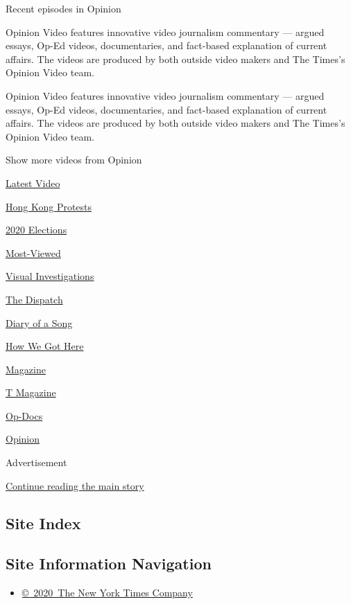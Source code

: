 Recent episodes in Opinion

Opinion Video features innovative video journalism commentary --- argued
essays, Op-Ed videos, documentaries, and fact-based explanation of
current affairs. The videos are produced by both outside video makers
and The Times's Opinion Video team.

Opinion Video features innovative video journalism commentary --- argued
essays, Op-Ed videos, documentaries, and fact-based explanation of
current affairs. The videos are produced by both outside video makers
and The Times's Opinion Video team.

Show more videos from Opinion

\href{/video}{}

\href{/video/latest-video}{Latest Video}

\href{/video/hk-protest}{Hong Kong Protests}

\href{/video/2020-Elections}{2020 Elections}

\href{/video/Most-Viewed}{Most-Viewed}

\href{/video/investigations}{Visual Investigations}

\href{/video/on-the-ground}{The Dispatch}

\href{/video/diaryofasong}{Diary of a Song}

\href{/video/how-we-got-here}{How We Got Here}

\href{/video/magazine}{Magazine}

\href{/video/t-magazine}{T Magazine}

\href{/video/op-docs}{Op-Docs}

\href{/video/opinion}{Opinion}

Advertisement

\protect\hyperlink{after-bottom}{Continue reading the main story}

\hypertarget{site-index}{%
\subsection{Site Index}\label{site-index}}

\hypertarget{site-information-navigation}{%
\subsection{Site Information
Navigation}\label{site-information-navigation}}

\begin{itemize}
\tightlist
\item
  \href{https://help.nytimes3xbfgragh.onion/hc/en-us/articles/115014792127-Copyright-notice}{©~2020~The
  New York Times Company}
\end{itemize}

